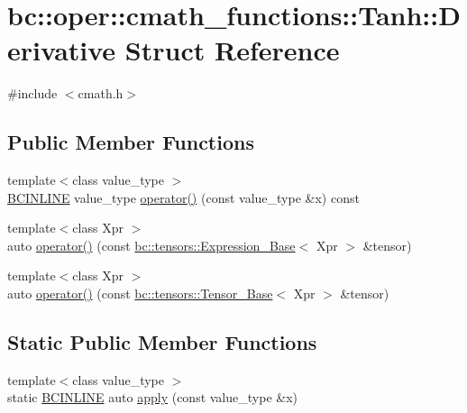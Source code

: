 \hypertarget{structbc_1_1oper_1_1cmath__functions_1_1Tanh_1_1Derivative}{}\section{bc\+:\+:oper\+:\+:cmath\+\_\+functions\+:\+:Tanh\+:\+:Derivative Struct Reference}
\label{structbc_1_1oper_1_1cmath__functions_1_1Tanh_1_1Derivative}


{\ttfamily \#include $<$cmath.\+h$>$}

\subsection*{Public Member Functions}
\begin{DoxyCompactItemize}
\item 
{\footnotesize template$<$class value\+\_\+type $>$ }\\\hyperlink{common_8h_a6699e8b0449da5c0fafb878e59c1d4b1}{B\+C\+I\+N\+L\+I\+NE} value\+\_\+type \hyperlink{structbc_1_1oper_1_1cmath__functions_1_1Tanh_1_1Derivative_a03eec0c845330cda9e982670e524e792}{operator()} (const value\+\_\+type \&x) const
\item 
{\footnotesize template$<$class Xpr $>$ }\\auto \hyperlink{structbc_1_1oper_1_1cmath__functions_1_1Tanh_1_1Derivative_ab756fc9613207ed446b956ff42539d2b}{operator()} (const \hyperlink{classbc_1_1tensors_1_1Expression__Base}{bc\+::tensors\+::\+Expression\+\_\+\+Base}$<$ Xpr $>$ \&tensor)
\item 
{\footnotesize template$<$class Xpr $>$ }\\auto \hyperlink{structbc_1_1oper_1_1cmath__functions_1_1Tanh_1_1Derivative_aef14206605ecc307fa84042de0a3a1b1}{operator()} (const \hyperlink{classbc_1_1tensors_1_1Tensor__Base}{bc\+::tensors\+::\+Tensor\+\_\+\+Base}$<$ Xpr $>$ \&tensor)
\end{DoxyCompactItemize}
\subsection*{Static Public Member Functions}
\begin{DoxyCompactItemize}
\item 
{\footnotesize template$<$class value\+\_\+type $>$ }\\static \hyperlink{common_8h_a6699e8b0449da5c0fafb878e59c1d4b1}{B\+C\+I\+N\+L\+I\+NE} auto \hyperlink{structbc_1_1oper_1_1cmath__functions_1_1Tanh_1_1Derivative_a5e0b4def05ea53f0dd527581227402a7}{apply} (const value\+\_\+type \&x)
\end{DoxyCompactItemize}


